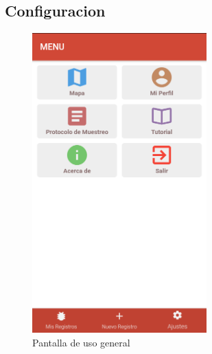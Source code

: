 \begin{itemize}
				\subsection{Configuracion}
					\begin{figure}
						\centering
							\includegraphics[width=0.6\textwidth]{Screenshots/configuracion.png}
									\caption{Pantalla de uso general}
							\label{fig:configuracion}
					\end{figure}


\end{itemize}
